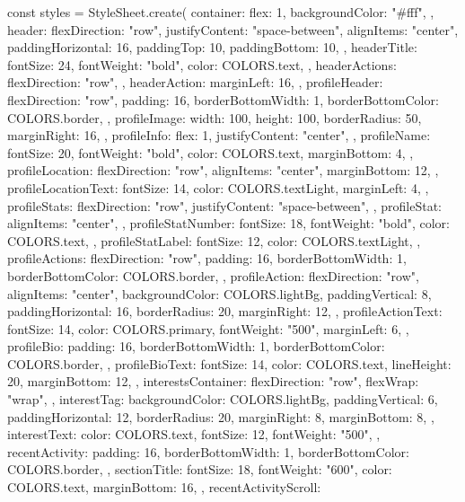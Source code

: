 const styles = StyleSheet.create({
  container: {
    flex: 1,
    backgroundColor: "#fff",
  },
  header: {
    flexDirection: "row",
    justifyContent: "space-between",
    alignItems: "center",
    paddingHorizontal: 16,
    paddingTop: 10,
    paddingBottom: 10,
  },
  headerTitle: {
    fontSize: 24,
    fontWeight: "bold",
    color: COLORS.text,
  },
  headerActions: {
    flexDirection: "row",
  },
  headerAction: {
    marginLeft: 16,
  },
  profileHeader: {
    flexDirection: "row",
    padding: 16,
    borderBottomWidth: 1,
    borderBottomColor: COLORS.border,
  },
  profileImage: {
    width: 100,
    height: 100,
    borderRadius: 50,
    marginRight: 16,
  },
  profileInfo: {
    flex: 1,
    justifyContent: "center",
  },
  profileName: {
    fontSize: 20,
    fontWeight: "bold",
    color: COLORS.text,
    marginBottom: 4,
  },
  profileLocation: {
    flexDirection: "row",
    alignItems: "center",
    marginBottom: 12,
  },
  profileLocationText: {
    fontSize: 14,
    color: COLORS.textLight,
    marginLeft: 4,
  },
  profileStats: {
    flexDirection: "row",
    justifyContent: "space-between",
  },
  profileStat: {
    alignItems: "center",
  },
  profileStatNumber: {
    fontSize: 18,
    fontWeight: "bold",
    color: COLORS.text,
  },
  profileStatLabel: {
    fontSize: 12,
    color: COLORS.textLight,
  },
  profileActions: {
    flexDirection: "row",
    padding: 16,
    borderBottomWidth: 1,
    borderBottomColor: COLORS.border,
  },
  profileAction: {
    flexDirection: "row",
    alignItems: "center",
    backgroundColor: COLORS.lightBg,
    paddingVertical: 8,
    paddingHorizontal: 16,
    borderRadius: 20,
    marginRight: 12,
  },
  profileActionText: {
    fontSize: 14,
    color: COLORS.primary,
    fontWeight: "500",
    marginLeft: 6,
  },
  profileBio: {
    padding: 16,
    borderBottomWidth: 1,
    borderBottomColor: COLORS.border,
  },
  profileBioText: {
    fontSize: 14,
    color: COLORS.text,
    lineHeight: 20,
    marginBottom: 12,
  },
  interestsContainer: {
    flexDirection: "row",
    flexWrap: "wrap",
  },
  interestTag: {
    backgroundColor: COLORS.lightBg,
    paddingVertical: 6,
    paddingHorizontal: 12,
    borderRadius: 20,
    marginRight: 8,
    marginBottom: 8,
  },
  interestText: {
    color: COLORS.text,
    fontSize: 12,
    fontWeight: "500",
  },
  recentActivity: {
    padding: 16,
    borderBottomWidth: 1,
    borderBottomColor: COLORS.border,
  },
  sectionTitle: {
    fontSize: 18,
    fontWeight: "600",
    color: COLORS.text,
    marginBottom: 16,
  },
  recentActivityScroll: {
}}

